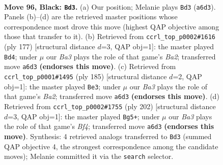 \documentclass[11pt]{article}
\begin{document}
\clearpage

\begin{figure}[p]\centering
\begin{subfigure}{0.46\textwidth}\centering
\resizebox{\linewidth}{!}{%
\newchessgame
\chessboard[
  setfen={8/5k2/b6K/5p2/5P2/8/8/8 b - - 7 96},
  showmover=false,
  pgfstyle=straightmove, color=movearrow, markmove={a6-d3}
]}
\caption{}
\end{subfigure}\hfill
\begin{subfigure}{0.46\textwidth}\centering
\resizebox{\linewidth}{!}{%
\newchessgame
\chessboard[
  setfen={8/b7/8/4p3/B1K1P3/8/3k4/8 b - - 1 89},
  showmover=false,
  pgfstyle=straightmove, color=movearrow, markmove={a7-d4}
]}
\caption{}
\end{subfigure}
\\[4pt]
\begin{subfigure}{0.46\textwidth}\centering
\resizebox{\linewidth}{!}{%
\newchessgame
\chessboard[
  setfen={3k4/b7/8/4p3/8/5P2/B7/4K3 b - - 8 93},
  showmover=false,
  pgfstyle=straightmove, color=movearrow, markmove={a7-e3}
]}
\caption{}
\end{subfigure}\hfill
\begin{subfigure}{0.46\textwidth}\centering
\resizebox{\linewidth}{!}{%
\newchessgame
\chessboard[
  setfen={8/1b6/5k2/7p/5B1P/8/5K2/8 w - - 5 102},
  showmover=false,
  pgfstyle=straightmove, color=movearrow, markmove={f4-g5}
]}
\caption{}
\end{subfigure}
\caption{\textbf{Move 96, Black: \texttt{Bd3}.} (a) Our position; Melanie plays \texttt{Bd3} (\texttt{a6d3}). Panels (b)--(d) are the retrieved master positions whose correspondence most drove this move (highest QAP objective among those that transfer to it). (b) Retrieved from \texttt{ccrl\_top\_p0002\#1616} (ply 177) [structural distance $d$=3, QAP obj=1]: the master played \texttt{Bd4}; under $\mu$ our \emph{Ba3} plays the role of that game's \emph{Ba2}; transferred move \texttt{a6d3} \textbf{(endorses this move)}. (c) Retrieved from \texttt{ccrl\_top\_p0001\#1495} (ply 185) [structural distance $d$=2, QAP obj=1]: the master played \texttt{Be3}; under $\mu$ our \emph{Ba3} plays the role of that game's \emph{Ba2}; transferred move \texttt{a6d3} \textbf{(endorses this move)}. (d) Retrieved from \texttt{ccrl\_top\_p0002\#1755} (ply 202) [structural distance $d$=3, QAP obj=1]: the master played \texttt{Bg5+}; under $\mu$ our \emph{Ba3} plays the role of that game's \emph{Bf4}; transferred move \texttt{a6d3} \textbf{(endorses this move)}. Synthesis: 4 retrieved analogs transferred to \texttt{Bd3} (summed QAP objective 4, the strongest correspondence among the candidate moves); Melanie committed it via the \texttt{search} selector.}
\label{fig:thought-m191}
\end{figure}
\end{document}
